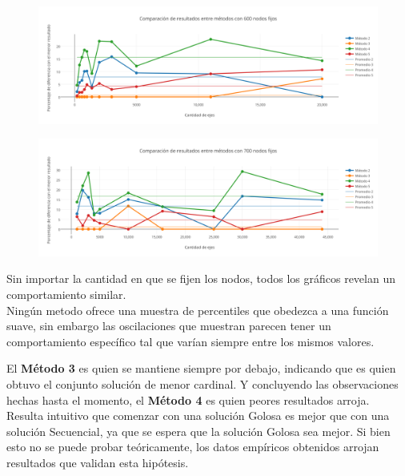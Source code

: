  \newpage
   \begin{figure}[h!]
   \begin{center}
 	\includegraphics[scale=0.55]{imagenes/local/resultados/600nodos.png}
   \end{center}
 \end{figure}

  \begin{figure}[h!]
   \begin{center}
 	\includegraphics[scale=0.55]{imagenes/local/resultados/700nodos.png}
   \end{center}
 \end{figure} 

Sin importar la cantidad en que se fijen los nodos, todos los gráficos revelan un comportamiento similar.\\

Ningún metodo ofrece una muestra de percentiles que obedezca a una función suave, sin embargo las oscilaciones que muestran parecen tener un comportamiento específico tal que varían siempre entre los mismos valores. 

El \textbf{Método 3} es quien se mantiene siempre por debajo, indicando que es quien obtuvo el conjunto solución de menor cardinal. Y concluyendo las observaciones hechas hasta el momento, el \textbf{Método 4 }es quien peores resultados arroja. \\

Resulta intuitivo que comenzar con una solución Golosa es mejor que con una solución Secuencial, ya que se espera que la solución Golosa sea mejor. Si bien esto no se puede probar teóricamente, los datos empíricos obtenidos arrojan resultados que validan esta hipótesis.

